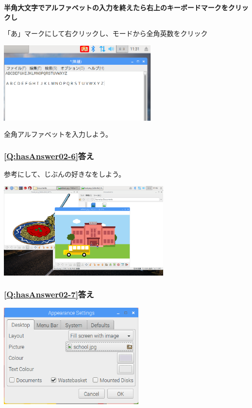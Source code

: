 \documentclass[a4paper,12pt]{jarticle}
\begin{document}
\bigskip

{\bfseries
  半角大文字でアルファベットの入力を終えたら右上のキーボードマークをクリックし

  「あ」マークにして右クリックし、モードから全角英数をクリック}



\bigskip

\bigskip


\centering
\includegraphics[width=0.6\textwidth]{textbook-img220.png}
\flushleft

\bigskip

全角アルファベットを入力しよう。
\clearpage

\subsubsection{\bfseries
\ref*{Q:hasAnswer02-6}答え}

参考にして、じぶんの好きなをしよう。

\centering
\includegraphics[width=0.65\textwidth]{textbook-img221.png}
\flushleft

\bigskip


\subsubsection{\bfseries
\ref*{Q:hasAnswer02-7}答え}



\centering
\includegraphics[width=0.55\textwidth]{textbook-img222.png}
\end{document}
